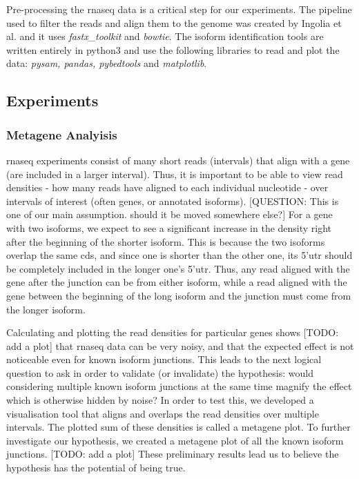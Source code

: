 \documentclass[12pt]{article}
\begin{document}
Pre-processing the \acrshort{rnaseq} data is a critical step for our experiments. The pipeline used to filter the reads and align them to the genome was created by Ingolia et al. \cite{Ingolia2012} and it uses \textit{fastx\_toolkit} and \textit{bowtie}. The isoform identification tools are written entirely in python3 and use the following libraries to read and plot the data: \textit{pysam, pandas, pybedtools} and \textit{matplotlib}. 

\subsection{Experiments}\label{experiments}
\subsubsection{Metagene Analyisis}\label{metagene}
\acrshort{rnaseq} experiments consist of many short reads (intervals) that align with a gene (are included in a larger interval). Thus, it is important to be able to view read densities - how many reads have aligned to each individual nucleotide - over intervals of interest (often genes, or annotated isoforms). {\tiny [QUESTION: This is one of our main assumption. should it be moved somewhere else?]} For a gene with two isoforms, we expect to see a significant increase in the density right after the beginning of the shorter isoform. This is because the two isoforms overlap the same \acrshort{cds}, and since one is shorter than the other one, its 5'\acrshort{utr} should be completely included in the longer one's 5'\acrshort{utr}. Thus, any read aligned with the gene after the junction can be from either isoform, while a read aligned with the gene between the beginning of the long isoform and the junction must come from the longer isoform. 

Calculating and plotting the read densities for particular genes shows {\tiny [TODO: add a plot]} that \acrshort{rnaseq} data can be very noisy, and that the expected effect is not noticeable even for known isoform junctions. This leads to the next logical question to ask in order to validate (or invalidate) the hypothesis: would considering multiple known isoform junctions at the same time magnify the effect which is otherwise hidden by noise? In order to test this, we developed a visualisation tool that aligns and overlaps the read densities over multiple intervals. The plotted sum of these densities is called a metagene plot. To further investigate our hypothesis, we created a metagene plot of all the known isoform junctions. {\tiny [TODO: add a plot]} These preliminary results lead us to believe the hypothesis has the potential of being true. 
\end{document}
